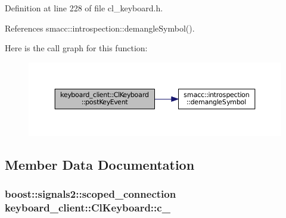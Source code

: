 Definition at line 228 of file cl\+\_\+keyboard.\+h.



References smacc\+::introspection\+::demangle\+Symbol().




Here is the call graph for this function\+:
\nopagebreak
\begin{figure}[H]
\begin{center}
\leavevmode
\includegraphics[width=350pt]{classkeyboard__client_1_1ClKeyboard_ad62d3548adfeca7f31469a283454dbeb_cgraph}
\end{center}
\end{figure}




\subsection{Member Data Documentation}
\subsubsection[{\texorpdfstring{c\+\_\+}{c_}}]{\setlength{\rightskip}{0pt plus 5cm}boost\+::signals2\+::scoped\+\_\+connection keyboard\+\_\+client\+::\+Cl\+Keyboard\+::c\+\_\+}\hypertarget{classkeyboard__client_1_1ClKeyboard_a32d0c1c037454900708b58b709767e56}{}\label{classkeyboard__client_1_1ClKeyboard_a32d0c1c037454900708b58b709767e56}


